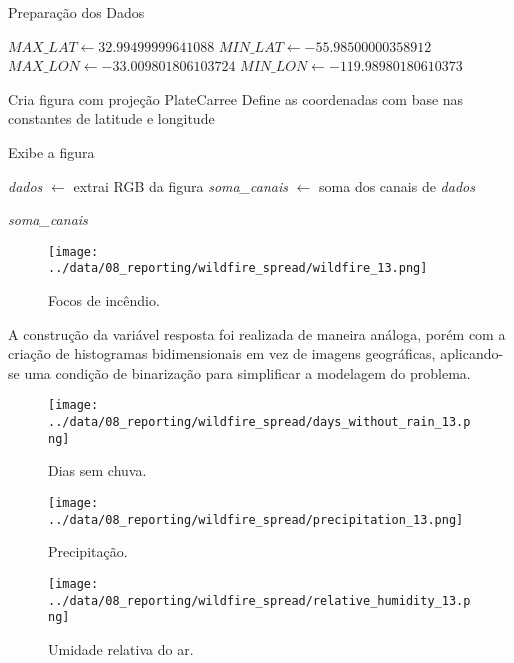 \documentclass[journal]{IEEEtran}
\begin{document}
\begin{algorithm}
    \caption{Preparação dos Dados}
    \begin{algorithmic}[1]
            \State $MAX\_LAT \gets 32.99499999641088$
            \State $MIN\_LAT \gets -55.98500000358912$
            \State $MAX\_LON \gets -33.009801806103724$
            \State $MIN\_LON \gets -119.98980180610373$

            \State Cria figura com projeção PlateCarree
            \State Define as coordenadas com base nas constantes de latitude e longitude

            \State Exibe a figura

            \State \textit{dados} $\gets$ extrai RGB da figura
            \State \textit{soma\_canais} $\gets$ soma dos canais de \textit{dados}

            \State \Return \textit{soma\_canais}
        \EndProcedure
    \end{algorithmic}
\end{algorithm}

\begin{figure}[h]
        \centering
        \texttt{[image: ../data/08\_reporting/wildfire\_spread/wildfire\_13.png]}
        \caption{Focos de incêndio.}
        \label{fig:wildfire}
\end{figure}

A construção da variável resposta foi realizada de maneira análoga, porém com a criação de histogramas bidimensionais em vez de imagens geográficas, aplicando-se uma condição de binarização para simplificar a modelagem do problema.

\begin{figure}[h]
        \centering
        \texttt{[image: ../data/08\_reporting/wildfire\_spread/days\_without\_rain\_13.png]}
        \caption{Dias sem chuva.}
        \label{fig:daysWithoutRain}
\end{figure}

\begin{figure}[h]
        \centering
        \texttt{[image: ../data/08\_reporting/wildfire\_spread/precipitation\_13.png]}
        \caption{Precipitação.}
        \label{fig:precipitation}
\end{figure}

\begin{figure}[h]
        \centering
        \texttt{[image: ../data/08\_reporting/wildfire\_spread/relative\_humidity\_13.png]}
        \caption{Umidade relativa do ar.}
        \label{fig:relativeHumidity}
\end{figure}
\end{document}
